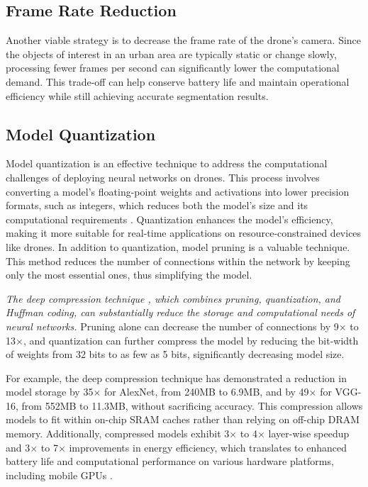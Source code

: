 \documentclass[a4paper]{article}
\begin{document}
\subsection{Frame Rate Reduction}

Another viable strategy is to decrease the frame rate of the drone’s camera. Since the objects of interest in an urban area are typically static or change slowly, processing fewer frames per second can significantly lower the computational demand. This trade-off can help conserve battery life and maintain operational efficiency while still achieving accurate segmentation results.

\subsection{Model Quantization}

Model quantization is an effective technique to address the computational challenges of deploying neural networks on drones. This process involves converting a model’s floating-point weights and activations into lower precision formats, such as integers, which reduces both the model’s size and its computational requirements \cite{han2016}. Quantization enhances the model’s efficiency, making it more suitable for real-time applications on resource-constrained devices like drones. In addition to quantization, model pruning is a valuable technique. This method reduces the number of connections within the network by keeping only the most essential ones, thus simplifying the model.

\textit{The deep compression technique \cite{han2016}, which combines pruning, quantization, and Huffman coding, can substantially reduce the storage and computational needs of neural networks.} Pruning alone can decrease the number of connections by 9× to 13×, and quantization can further compress the model by reducing the bit-width of weights from 32 bits to as few as 5 bits, significantly decreasing model size.

For example, the deep compression technique has demonstrated a reduction in model storage by 35× for AlexNet, from 240MB to 6.9MB, and by 49× for VGG-16, from 552MB to 11.3MB, without sacrificing accuracy. This compression allows models to fit within on-chip SRAM caches rather than relying on off-chip DRAM memory. Additionally, compressed models exhibit 3× to 4× layer-wise speedup and 3× to 7× improvements in energy efficiency, which translates to enhanced battery life and computational performance on various hardware platforms, including mobile GPUs \cite{han2016}.
\end{document}
